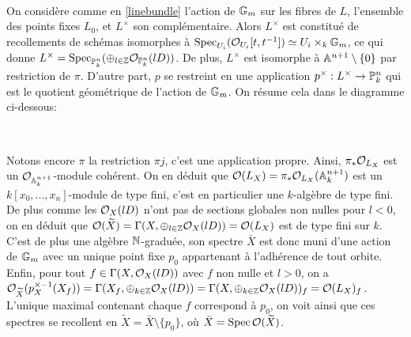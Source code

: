 	\begin{center}
	\\
	\end{center}


On considère comme en \ref{linebundle} l'action de $\mathbb{G}_m$ sur les fibres de $L$, l'ensemble des points fixes $L_0$, et $L^\times$ son complémentaire. Alors $L^\times$ est constitué de recollements de schémas isomorphes à $\operatorname{Spec}_{U_i}( \mathcal{O}_{U_i}[t,t^{-1}])\simeq U_i \times_k \mathbb{G}_m$, ce qui donne $L^\times=\operatorname{Spec}_{\mathbb{P}^n_k}(\oplus_{l\in \mathbb{Z}}\mathcal{O}_{\mathbb{P}^n_k}(lD))$. De plus, $L^\times$ est isomorphe à $\mathbb{A}^{n+1}\setminus\lbrace 0 \rbrace$ par restriction de $\pi$. D'autre part, $p$ se restreint en une application $p^\times:L^\times \rightarrow \mathbb{P}^n_k$ qui est le quotient géométrique de l'action de $\mathbb{G}_m$. On résume cela dans le diagramme ci-dessous:

	\begin{center}
	\\
	\end{center}

Notons encore $\pi$ la restriction $\pi j$, c'est une application propre. Ainsi, $\pi_*\mathcal{O}_{L_X}$ est un $\mathcal{O}_{\mathbb{A}_k^{n+1}}$-module cohérent. On en déduit que $\mathcal{O}(L_X)=\pi_*\mathcal{O}_{L_X}(\mathbb{A}_k^{n+1})$ est un $k[x_0,...,x_n]$-module de type fini, c'est en particulier une $k$-algèbre de type fini. De plus comme les $\mathcal{O}_X(lD)$ n'ont pas de sections globales non nulles pour $l<0$, on en déduit que $\mathcal{O}(\widetilde{X})=\Gamma(X,\oplus_{l\in \mathbb{Z}}\mathcal{O}_X(lD))=\mathcal{O}(L_X)$ est de type fini sur $k$. C'est de plus une algèbre $\mathbb{N}$-graduée, son spectre $\bar{X}$ est donc muni d'une action de $\mathbb{G}_m$ avec un unique point fixe $p_0$ appartenant à l'adhérence de tout orbite. Enfin, pour tout $f\in \Gamma(X,\mathcal{O}_X(lD))$ avec $f$ non nulle et $l>0$, on a  $\mathcal{O}_{\widetilde{X}}(p_X^{\times-1}(X_f))=\Gamma(X_f,\oplus_{k\in \mathbb{Z}}\mathcal{O}_X(lD))=\Gamma(X,\oplus_{k\in \mathbb{Z}}\mathcal{O}_X(lD))_f=\mathcal{O}(L_X)_f$. L'unique maximal contenant chaque $f$ correspond à $p_0$, on voit ainsi que ces spectres se recollent en $\widetilde{X}=\bar{X}\setminus \lbrace p_0 \rbrace$, où $\bar{X}=\operatorname{Spec}\mathcal{O}(\widetilde{X})$.\\


